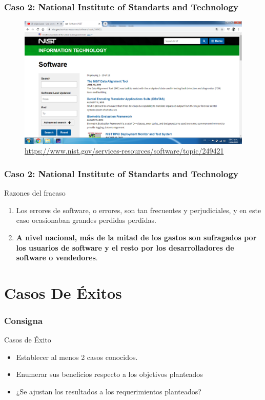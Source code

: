 \documentclass[11pt]{beamer}
\begin{document}
	\begin{frame}
		\frametitle{Caso 2: National Institute of Standarts and Technology}
		\begin{figure}
			\centering
			\includegraphics[width=\textheight]{NIST.PNG}
			\caption{{\scriptsize \url{https://www.nist.gov/services-resources/software/topic/249421}}}
		\end{figure}
	\end{frame}
    
    \begin{frame}
    	\frametitle{Caso 2: National Institute of Standarts and Technology}
    	\begin{block}{Razones del fracaso}
    		 \begin{enumerate}
    		 	\item Los errores de software, o errores, son tan frecuentes y perjudiciales, y en este caso ocasionaban grandes perdidas perdidas.
    		 	\pause
    		 	\item \textbf{A nivel nacional, más de la mitad de los gastos son sufragados por los usuarios de software y el resto por los desarrolladores de software o vendedores}.
    		 \end{enumerate}
    	\end{block}
    \end{frame}

    \section{Casos De Éxitos}
    
    \begin{frame}
    	\frametitle{Consigna}
    	\begin{exampleblock}{Casos de Éxito}
    		\begin{itemize}
    			\item Establecer al menos 2 casos conocidos.
    			\item Enumerar sus beneficios respecto a los objetivos planteados
    			\item ¿Se ajustan los resultados a los requerimientos planteados?
    		\end{itemize}
    	\end{exampleblock}
    \end{frame}
    
\end{document}
